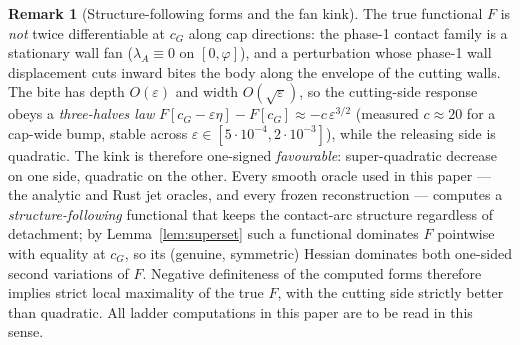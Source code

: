 \documentclass[11pt]{amsart}
\theoremstyle{plain}
\theoremstyle{definition}
\newtheorem{remark}[theorem]{Remark}
\newcommand{\cG}{c_{G}}
\begin{document}
\begin{remark}[Structure-following forms and the fan kink]
\label{rem:structure-following}
The true functional $F$ is \emph{not} twice differentiable at $\cG$
along cap directions: the phase-1 contact family is a stationary wall
fan ($\lambda_{A}\equiv0$ on $[0,\varphi]$), and a perturbation whose
phase-1 wall displacement cuts inward bites the body along the envelope
of the cutting walls.  The bite has depth $O(\varepsilon)$ and width
$O(\sqrt{\varepsilon})$, so the cutting-side response obeys a
\emph{three-halves law} $F[\cG-\varepsilon\eta]-F[\cG]\approx
-c\,\varepsilon^{3/2}$ (measured $c\approx20$ for a cap-wide bump,
stable across $\varepsilon\in[5\cdot10^{-4},2\cdot10^{-3}]$), while the
releasing side is quadratic.  The kink is therefore one-signed
\emph{favourable}: super-quadratic decrease on one side, quadratic on
the other.  Every smooth oracle used in this paper --- the analytic and
Rust jet oracles, and every frozen reconstruction --- computes a
\emph{structure-following} functional that keeps the contact-arc
structure regardless of detachment; by Lemma~\ref{lem:superset} such a
functional dominates $F$ pointwise with equality at $\cG$, so its
(genuine, symmetric) Hessian dominates both one-sided second variations
of $F$.  Negative definiteness of the computed forms therefore implies
strict local maximality of the true $F$, with the cutting side strictly
better than quadratic.  All ladder computations in this paper are to be
read in this sense.
\end{remark}
\end{document}
